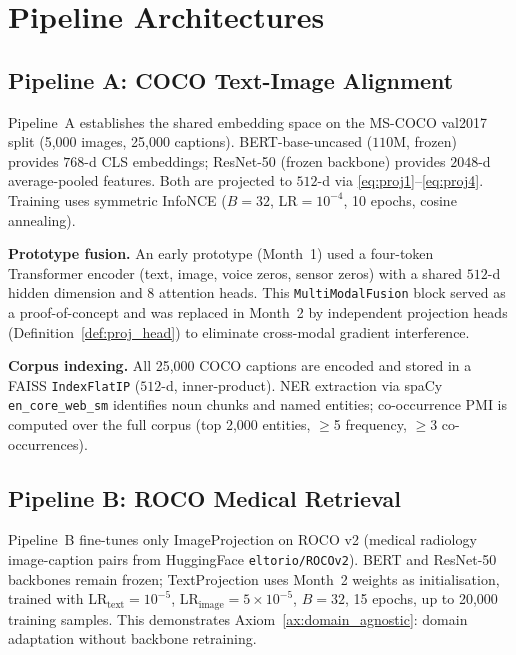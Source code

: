 \documentclass[10pt,conference]{IEEEtran}
\theoremstyle{ieeethm}
\theoremstyle{ieeedef}
\theoremstyle{ieeeremark}
\begin{document}
\section{Pipeline Architectures}
\label{sec:pipelines}

\subsection{Pipeline A: COCO Text-Image Alignment}

Pipeline~A establishes the shared embedding space on the MS-COCO val2017 split (5,000 images, 25,000 captions). BERT-base-uncased ($110$M, frozen) provides $768$-d CLS embeddings; ResNet-50 (frozen backbone) provides $2048$-d average-pooled features. Both are projected to $512$-d via \eqref{eq:proj1}--\eqref{eq:proj4}. Training uses symmetric InfoNCE ($B{=}32$, LR$=10^{-4}$, 10 epochs, cosine annealing).

\textbf{Prototype fusion.} An early prototype (Month~1) used a four-token Transformer encoder (text, image, voice zeros, sensor zeros) with a shared $512$-d hidden dimension and $8$ attention heads. This \texttt{MultiModalFusion} block served as a proof-of-concept and was replaced in Month~2 by independent projection heads (Definition~\ref{def:proj_head}) to eliminate cross-modal gradient interference.

\textbf{Corpus indexing.} All 25,000 COCO captions are encoded and stored in a FAISS \texttt{IndexFlatIP} ($512$-d, inner-product). NER extraction via spaCy \texttt{en\_core\_web\_sm} identifies noun chunks and named entities; co-occurrence PMI is computed over the full corpus (top 2,000 entities, $\geq$5 frequency, $\geq$3 co-occurrences).

\subsection{Pipeline B: ROCO Medical Retrieval}

Pipeline~B fine-tunes only ImageProjection on ROCO v2 \cite{pelka2018radiology} (medical radiology image-caption pairs from HuggingFace \texttt{eltorio/ROCOv2}). BERT and ResNet-50 backbones remain frozen; TextProjection uses Month~2 weights as initialisation, trained with LR$_{\text{text}}{=}10^{-5}$, LR$_{\text{image}}{=}5{\times}10^{-5}$, $B{=}32$, 15 epochs, up to 20,000 training samples. This demonstrates Axiom~\ref{ax:domain_agnostic}: domain adaptation without backbone retraining.
\end{document}
